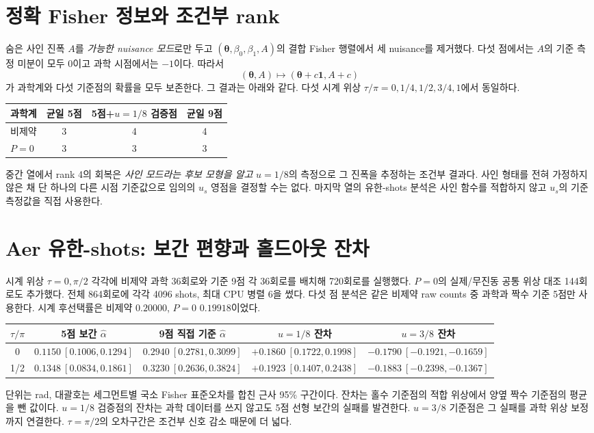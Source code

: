 \documentclass[11pt,a4paper]{article}
\begin{document}
\section{정확 Fisher 정보와 조건부 rank}
숨은 사인 진폭 $A$를 \emph{가능한 nuisance 모드}로만 두고
$(\boldsymbol\theta,\beta_0,\beta_1,A)$의 결합 Fisher 행렬에서
세 nuisance를 제거했다. 다섯 점에서는 $A$의 기준 측정 미분이
모두 0이고 과학 시점에서는 $-1$이다. 따라서
\begin{equation}
 (\boldsymbol\theta,A)\mapsto
 (\boldsymbol\theta+c\boldsymbol1,A+c)
\end{equation}
가 과학계와 다섯 기준점의 확률을 모두 보존한다. 그 결과는 아래와
같다. 다섯 시계 위상 $\tau/\pi=0,1/4,1/2,3/4,1$에서 동일하다.
\begin{center}
\begin{tabular}{@{}lccc@{}}
\toprule
과학계 & 균일 5점 & 5점+$u=1/8$ 검증점 & 균일 9점 \\
\midrule
비제약 & 3 & 4 & 4 \\
$P=0$ & 3 & 3 & 3 \\
\bottomrule
\end{tabular}
\end{center}
중간 열에서 rank 4의 회복은 \emph{사인 모드라는 후보 모형을 알고}
$u=1/8$의 측정으로 그 진폭을 추정하는 조건부 결과다. 사인 형태를
전혀 가정하지 않은 채 단 하나의 다른 시점 기준값으로 임의의
$u_s$ 영점을 결정할 수는 없다. 마지막 열의 유한-shots 분석은 사인
함수를 적합하지 않고 $u_s$의 기준 측정값을 직접 사용한다.

\section{Aer 유한-shots: 보간 편향과 홀드아웃 잔차}
시계 위상 $\tau=0,\pi/2$ 각각에 비제약 과학 36회로와 기준 9점
각 36회로를 배치해 720회로를 실행했다. $P=0$의 실제/무진동
공통 위상 대조 144회로도 추가했다. 전체 864회로에 각각 4096
shots, 최대 CPU 병렬 6을 썼다. 다섯 점 분석은 같은 비제약 raw
counts 중 과학과 짝수 기준 5점만 사용한다. 시계 후선택률은
비제약 $0.20000$, $P=0$ $0.19918$이었다.
\begin{center}
\begin{tabular}{@{}ccccc@{}}
\toprule
$\tau/\pi$ & 5점 보간 $\hat\alpha$ & 9점 직접 기준 $\hat\alpha$
& $u=1/8$ 잔차 & $u=3/8$ 잔차 \\
\midrule
0 & $0.1150\ [0.1006,0.1294]$ & $0.2940\ [0.2781,0.3099]$
& $+0.1860\ [0.1722,0.1998]$ & $-0.1790\ [-0.1921,-0.1659]$ \\
1/2 & $0.1348\ [0.0834,0.1861]$ & $0.3230\ [0.2636,0.3824]$
& $+0.1923\ [0.1407,0.2438]$ & $-0.1883\ [-0.2398,-0.1367]$ \\
\bottomrule
\end{tabular}
\end{center}
단위는 rad, 대괄호는 세그먼트별 국소 Fisher 표준오차를 합친 근사
95\% 구간이다. 잔차는 홀수 기준점의 적합 위상에서 양옆 짝수
기준점의 평균을 뺀 값이다. $u=1/8$ 검증점의 잔차는 과학 데이터를
쓰지 않고도 5점 선형 보간의 실패를 발견한다. $u=3/8$ 기준점은
그 실패를 과학 위상 보정까지 연결한다. $\tau=\pi/2$의 오차구간은
조건부 신호 감소 때문에 더 넓다.
\end{document}
